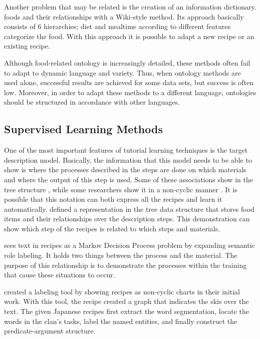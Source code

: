 Another problem that may be related is the creation of an information dictionary. \cite{gaillard2012interactive} foods and their relationships with a Wiki-style method. Its approach basically consists of 6 hierarchies; diet and mealtime according to different features categorize the food. With this approach it is possible to adapt a new recipe or an existing recipe.

Although food-related ontology is increasingly detailed, these methods often fail to adapt to dynamic language and variety. Thus, when ontology methods are used alone, successful results are achieved for some data sets, but success is often low. Moreover, in order to adapt these methods to a different language, ontologies should be structured in accordance with other languages.


\subsection{Supervised Learning Methods}

One of the most important features of tutorial learning techniques is the target description model. Basically, the information that this model needs to be able to show is where the processes described in the steps are done on which materials and where the output of this step is used. Some of these associations show in the tree structure \cite{jermsura}, while some researchers show it in a non-cyclic manner \cite{malmaud2014cooking}. It is possible that this notation can both express all the recipes and learn it automatically. \cite{jermsura} defined a representation in the tree data structure that stores food items and their relationships over the description steps. This demonstration can show which step of the recipes is related to which steps and materials.

\cite{malmaud2014cooking} sees text in recipes as a Markov Decision Process problem by expanding semantic role labeling. It holds two things between the process and the material. The purpose of this relationship is to demonstrate the processes within the training that cause these situations to occur.

\cite{mori2014flow} created a labeling tool by showing recipes as non-cyclic charts in their initial work. With this tool, the recipe created a graph that indicates the skis over the text. The given Japanese recipes first extract the word segmentation, locate the words in the clan's tasks, label the named entities, and finally construct the predicate-argument structure.

